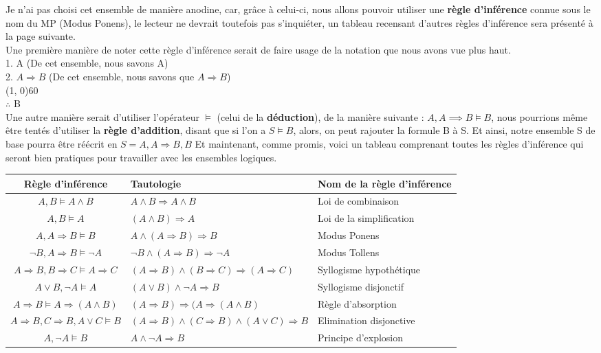 \documentclass[a4paper, 12pt]{article}
\newcommand{\imply}{\Rightarrow}
\numberwithin{equation}{subsection}
\begin{document}
  Je n'ai pas choisi cet ensemble de manière anodine, car, grâce à celui-ci, nous allons pouvoir utiliser une {\bf règle d'inférence} connue sous le nom du MP (Modus Ponens), le lecteur ne devrait toutefois pas s'inquiéter, un tableau recensant d'autres règles d'inférence sera présenté à la page suivante. \\
  Une première manière de noter cette règle d'inférence serait de faire usage de la notation que nous avons vue plus haut. \\[0.5cm]
    1. A (De cet ensemble, nous savons A) \\
    2. $A \imply B$ (De cet ensemble, nous savons que $A \imply B$) \\
  \hspace{10cm}\line(1, 0){60} \\
  $\therefore$ B \\[0.5cm]
  Une autre manière serait d'utiliser l'opérateur $\vDash$ (celui de la {\bf déduction}), de la manière suivante : $A, A \implies B \vDash B$, nous pourrions même être tentés d'utiliser la {\bf règle d'addition}, disant que si l'on a $S \vDash B$, alors, on peut rajouter la formule B à S. Et ainsi, notre ensemble S de base pourra être réécrit en $S = {A, A \imply B, B}$
  Et maintenant, comme promis, voici un tableau comprenant toutes les règles d'inférence qui seront bien pratiques pour travailler avec les ensembles logiques.
  \FloatBarrier
  \begin{adjustwidth}{300pt}{0pt}
    \begin{table}[H]
    \begin{tabular}{|c|M{5.0cm}|p{5.0cm}|}
      \hline Règle d'inférence & Tautologie & Nom de la règle d'inférence \\
      \hline $A, B \vDash A \land B$ & $A \land B \imply A \land B$& Loi de combinaison \\
      \hline $A, B \vDash A$ & $(A \land B) \imply A $& Loi de la simplification \\
      \hline $A, A \imply B \vDash B$ & $A \land (A \imply B) \imply B $ & Modus Ponens \\
      \hline $\neg B, A \imply B \vDash \neg A$ & $\neg B \land (A \imply B) \imply \neg A$ & Modus Tollens \\
      \hline $A \imply B, B \imply C \vDash A \imply C$ & $(A \imply B) \land (B \imply C) \imply (A \imply C)$ & Syllogisme hypothétique \\
      \hline $A \lor B, \neg A \vDash A$ & $(A \lor B) \land \neg A \imply B$ & Syllogisme disjonctif \\
      \hline $A \imply B \vDash A \imply (A \land B)$ & $(A \imply B) \imply (A \imply (A \land B)$ & Règle d'absorption \\
      \hline $A \imply B, C \imply B, A \lor C \vDash B$ & $(A \imply B) \land (C \imply B) \land (A \lor C) \imply B$ & Elimination disjonctive\\
      \hline $A, \neg A \vDash B$ & $A \land \neg A \imply B$ & Principe d'explosion \\
      \hline
    \end{tabular}
  \end{table}
\end{adjustwidth}
\end{document}
